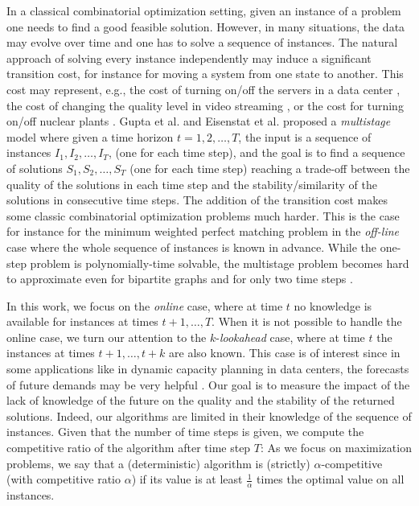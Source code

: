 \documentclass[a4paper]{book}
\newcommand{\finalversion}[1]{#1}
\begin{document}
In a classical combinatorial optimization setting, given an instance of a problem one needs to find a good feasible solution. However, in many situations, the data may evolve over time and one has to solve a sequence of instances. The natural approach of solving every instance independently may induce a significant transition cost, for instance for moving a system from one state to another. This cost may represent, e.g., the cost of turning on/off the servers in a data center \cite{LinWAT13,BansalGKPSS15,AntoniadisS17,AlbersQ18}, the cost of changing the quality level in video streaming \cite{Joseph}, or the cost for turning on/off nuclear plants \cite{thesececile}.  %
Gupta et al. \cite{Gupta} and Eisenstat et al. \cite{Eisenstat}  proposed
 a \emph{multistage} model where given  a time horizon $t = 1, 2, \ldots,T$,  the input is a sequence of instances $I_1,I_2,\ldots,I_T$, (one for each time step), and the goal is to find a sequence of solutions $S_1,S_2,\ldots,S_T$ (one for each time step) reaching  a trade-off between the quality of the solutions in each time step and the stability/similarity of the solutions in consecutive time steps. The addition of the transition cost makes some  classic combinatorial optimization problems much harder. This is the case  for instance  %
 for the minimum weighted perfect matching problem in the \emph{off-line} case where the whole sequence of instances is known in advance. While the one-step problem is polynomially-time solvable, the multistage problem becomes hard to approximate even for bipartite graphs and for only two time steps \cite{Bampis,Gupta}. 
 
 In this work, we focus on the \emph{online}  case, where at time $t$ no knowledge is available for instances at times $t+1, \ldots, T$.  When it is not possible to handle the online case, we turn our attention to the $k$-\emph{lookahead} case, where at time $t$ the instances at times $t+1, \ldots, t+k$ are also known. This case is of interest since in some applications like in  dynamic capacity planning in data centers,
 the forecasts of future demands may be very helpful  \cite{Lin,Liu}. Our goal is to measure the impact of the lack of  knowledge of the future  on the quality and the stability of the returned solutions. 
 Indeed, our algorithms are limited in their knowledge of the sequence of instances.
Given that the number of time steps is given, we compute the competitive ratio of the algorithm after time step $T$: As we focus on maximization problems, we say that a \finalversion{(deterministic)} algorithm is (strictly) $\alpha$-competitive (with competitive ratio $\alpha$) if its value is at least $\frac1\alpha$ times the optimal value on all instances.
\end{document}
